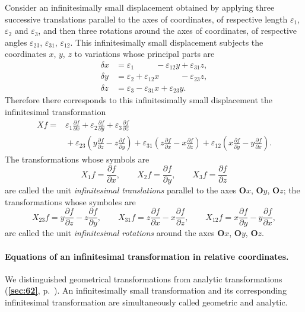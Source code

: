 \documentclass[leqno,11pt]{book}
\makeatletter
\numberwithin{equation}{chapter}
\newcommand{\pd}{\partial}
\theoremstyle{shape1}
\theoremstyle{shapesmall}
\let\old@epsilon\epsilon
\let\old@varepsilon\varepsilon
\let\epsilon\old@varepsilon
\let\varepsilon\old@epsilon
\newcommand{\fsref}[1]{{\rm\textsection\textbf{\ref{sec:#1}}}}
\makeatother
\begin{document}
{\small
Consider an infinitesimally small displacement obtained by applying three successive translations parallel to the axes of coordinates, of respective length $\epsilon_{1}$, $\epsilon_{2}$ and $\epsilon_{3}$, and then three rotations around the axes of coordinates, of respective angles $\epsilon_{23}$, $\epsilon_{31}$, $\epsilon_{12}$. This infinitesimally small displacement subjects the coordinates $x$, $y$, $z$ to variations whose principal parts are
\begin{align*}
  \delta x&=\epsilon_{1}{}\phantom{+\epsilon_{12}x}{}-\epsilon_{12}y+\epsilon_{31}z,\\
  \delta y&=\epsilon_{2}+\epsilon_{12}x\phantom{+\epsilon_{12}y}-\epsilon_{23}z,\\
  \delta z&=\epsilon_{3}-\epsilon_{31}x+\epsilon_{23}y.
\end{align*}
Therefore there corresponds to this infinitesimally small displacement the infinitesimal transformation
\begin{align*}
  Xf={}&{}\epsilon_{1}\frac{\pd f}{\pd x}+\epsilon_{2}\frac{\pd f}{\pd y}+\epsilon_{3}\frac{\pd f}{\pd z}\\
  &{}+\epsilon_{23}\left(y\frac{\pd f}{\pd z}-z\frac{\pd f}{\pd y}\right)
  +\epsilon_{31}\left(z\frac{\pd f}{\pd x}-x\frac{\pd f}{\pd z}\right)
  +\epsilon_{12}\left(x\frac{\pd f}{\pd y}-y\frac{\pd f}{\pd x}\right).
\end{align*}
The transformations whose symbols are
\[
X_{1}f=\frac{\pd f}{\pd x},\qquad X_{2}f=\frac{\pd f}{\pd y},\qquad X_{3}f=\frac{\pd f}{\pd z}
\]
are called the unit \emph{infinitesimal translations} parallel to the axes $\mathbf{O}x$, $\mathbf{O}y$, $\mathbf{O}z$; the transformations whose symboles are
\[
X_{23}f=y\frac{\pd f}{\pd z}-z\frac{\pd f}{\pd y},\qquad
X_{31}f=z\frac{\pd f}{\pd x}-x\frac{\pd f}{\pd z},\qquad
X_{12}f=x\frac{\pd f}{\pd y}-y\frac{\pd f}{\pd x},
\] 
}
are called the unit \emph{infinitesimal rotations} around the axes $\mathbf{O}x$, $\mathbf{O}y$, $\mathbf{O}z$.

\paragraph{Equations of an infinitesimal transformation in relative coordinates.}
\label{sec:69}
We distinguished geometrical transformations from analytic transformations (\fsref{62}, p.~\pageref{sec:62}). An infinitesimally small transformation and its corresponding infinitesimal transformation are simultaneously called geometric and analytic.
\end{document}

